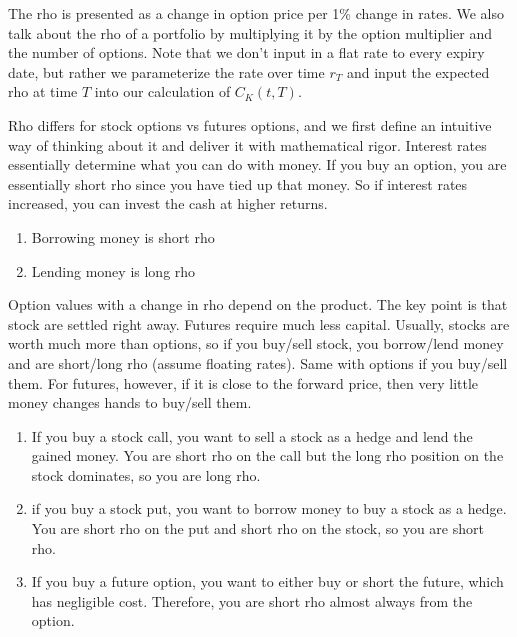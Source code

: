 \documentclass{article}
\begin{document}
    The rho is presented as a change in option price per 1\% change in rates. We also talk about the rho of a portfolio by multiplying it by the option multiplier and the number of options. Note that we don't input in a flat rate to every expiry date, but rather we parameterize the rate over time $r_T$ and input the expected rho at time $T$ into our calculation of $C_K (t, T)$.

    Rho differs for stock options vs futures options, and we first define an intuitive way of thinking about it and deliver it with mathematical rigor. Interest rates essentially determine what you can do with money. If you buy an option, you are essentially short rho since you have tied up that money. So if interest rates increased, you can invest the cash at higher returns.
    \begin{enumerate}
      \item Borrowing money is short rho
      \item Lending money is long rho
    \end{enumerate}

    Option values with a change in rho depend on the product. The key point is that stock are settled right away. Futures require much less capital. Usually, stocks are worth much more than options, so if you buy/sell stock, you borrow/lend money and are short/long rho (assume floating rates). Same with options if you buy/sell them. For futures, however, if it is close to the forward price, then very little money changes hands to buy/sell them.

    \begin{enumerate}
      \item If you buy a stock call, you want to sell a stock as a hedge and lend the gained money. You are short rho on the call but the long rho position on the stock dominates, so you are long rho.
      \item if you buy a stock put, you want to borrow money to buy a stock as a hedge. You are short rho on the put and short rho on the stock, so you are short rho.
      \item If you buy a future option, you want to either buy or short the future, which has negligible cost. Therefore, you are short rho almost always from the option.
    \end{enumerate}
\end{document}
